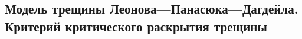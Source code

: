 

\subsection{Модель трещины Леонова—Панасюка—Дагдейла. Критерий критического раскрытия трещины}



